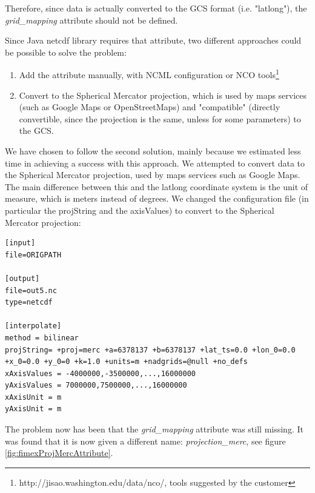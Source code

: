 \documentclass[11pt,a4paper,titlepage,oneside]{report}
\begin{document}
Therefore, since data is actually converted to the \gls{GCS} format (i.e. "latlong"), the \textit{grid\_mapping} attribute should not be defined.

Since Java \gls{netcdf} library requires that attribute, two different approaches could be possible to solve the problem:
\begin{enumerate}
\item Add the attribute manually, with \gls{NCML} configuration or \gls{NCO} tools\footnote{http://jisao.washington.edu/data/nco/, tools suggested by the customer}
\item Convert to the Spherical Mercator projection, which is used by maps services (such as Google Maps or OpenStreetMaps) and "compatible" (directly convertible, since the projection is the same, unless for some parameters) to the \gls{GCS}.
\end{enumerate}

We have chosen to follow the second solution, mainly because we estimated less time in achieving a success with this approach. We attempted to convert data to the Spherical Mercator projection, used by maps services such as Google Maps. The main difference between this and the latlong coordinate system is the unit of measure, which is meters instead of degrees.
We changed the configuration file (in particular the projString and the axisValues) to convert to the Spherical Mercator projection:
\begin{lstlisting}
[input]
file=ORIGPATH

[output]
file=out5.nc
type=netcdf

[interpolate]
method = bilinear
projString= +proj=merc +a=6378137 +b=6378137 +lat_ts=0.0 +lon_0=0.0 +x_0=0.0 +y_0=0 +k=1.0 +units=m +nadgrids=@null +no_defs
xAxisValues = -4000000,-3500000,...,16000000
yAxisValues = 7000000,7500000,...,16000000
xAxisUnit = m
yAxisUnit = m
\end{lstlisting}

The problem now has been that the \textit{grid\_mapping} attribute was still missing. It was found that it is now given a different name: \textit{projection\_merc}, see figure \ref{fig:fimexProjMercAttribute}.
\end{document}
